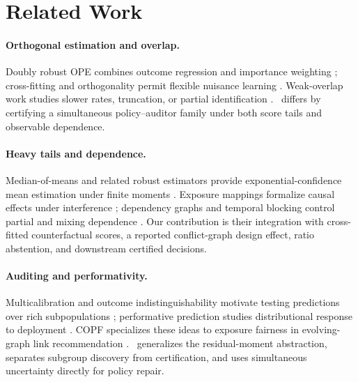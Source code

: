 \section{Related Work}
\label{sec:related}

\paragraph{Orthogonal estimation and overlap.}
Doubly robust OPE combines outcome regression and importance weighting \citep{dudik2011doubly,jiang2016doubly,farajtabar2018more}; cross-fitting and orthogonality permit flexible nuisance learning \citep{chernozhukov2018double,foster2019orthogonal}. Weak-overlap work studies slower rates, truncation, or partial identification \citep{wang2017optimal,mehrabi2024weak,khan2024beyond}. \COMET\ differs by certifying a simultaneous policy--auditor family under both score tails and observable dependence.

\paragraph{Heavy tails and dependence.}
Median-of-means and related robust estimators provide exponential-confidence mean estimation under finite moments \citep{lugosi2019mean}. Exposure mappings formalize causal effects under interference \citep{aronow2017estimating,savje2021average}; dependency graphs and temporal blocking control partial and mixing dependence \citep{janson2004large,merlevede2009bernstein}. Our contribution is their integration with cross-fitted counterfactual scores, a reported conflict-graph design effect, ratio abstention, and downstream certified decisions.

\paragraph{Auditing and performativity.}
Multicalibration and outcome indistinguishability motivate testing predictions over rich subpopulations \citep{hebertjohnson2018multicalibration,dwork2021outcome}; performative prediction studies distributional response to deployment \citep{perdomo2020performative}. COPF specializes these ideas to exposure fairness in evolving-graph link recommendation \citep{li2026copf}. \COMET\ generalizes the residual-moment abstraction, separates subgroup discovery from certification, and uses simultaneous uncertainty directly for policy repair.
